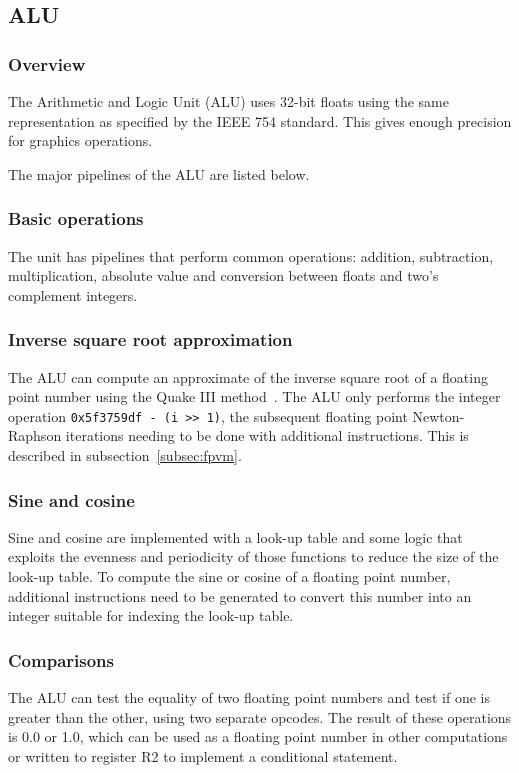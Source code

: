 \documentclass[a4paper,11pt]{kthesis}
\begin{document}
\subsection{ALU}
\subsubsection{Overview}
The Arithmetic and Logic Unit (ALU) uses 32-bit floats using the same representation as specified by the IEEE 754 standard. This gives enough precision for graphics operations.

The major pipelines of the ALU are listed below.

\subsubsection{Basic operations}
The unit has pipelines that perform common operations: addition, subtraction, multiplication, absolute value and conversion between floats and two's complement integers.

\subsubsection{Inverse square root approximation}
The ALU can compute an approximate of the inverse square root of a floating point number using the Quake III method~\cite{invsqrt}. The ALU only performs the integer operation \verb!0x5f3759df - (i >> 1)!, the subsequent floating point Newton-Raphson iterations needing to be done with additional instructions. This is described in subsection~\ref{subsec:fpvm}.

\subsubsection{Sine and cosine}
Sine and cosine are implemented with a look-up table and some logic that exploits the evenness and periodicity of those functions to reduce the size of the look-up table. To compute the sine or cosine of a floating point number, additional instructions need to be generated to convert this number into an integer suitable for indexing the look-up table.

\subsubsection{Comparisons}
The ALU can test the equality of two floating point numbers and test if one is greater than the other, using two separate opcodes. The result of these operations is 0.0 or 1.0, which can be used as a floating point number in other computations or written to register R2 to implement a conditional statement.
\end{document}
